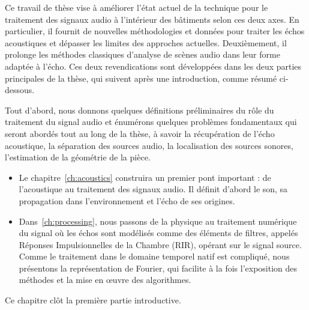 \mynewline
Ce travail de thèse vise à améliorer l'état actuel de la technique pour le traitement des signaux audio à l'intérieur des bâtiments selon ces deux axes.
En particulier, il fournit de nouvelles méthodologies et données pour traiter les échos acoustiques et dépasser les limites des approches actuelles.
Deuxièmement, il prolonge les méthodes classiques d'analyse de scènes audio dans leur forme adaptée à l'écho.
Ces deux revendications sont développées dans les deux parties principales de la thèse, qui suivent après une introduction, comme résumé ci-dessous.

Tout d'abord, nous donnons quelques définitions préliminaires du rôle du traitement du signal audio et énumérons quelques problèmes fondamentaux qui seront abordés tout au long de la thèse, à savoir la récupération de l'écho acoustique, la séparation des sources audio, la localisation des sources sonores, l'estimation de la géométrie de la pièce.
\begin{itemize}
    \item
    Le chapitre~\ref{ch:acoustics} construira un premier pont important : de l'acoustique au traitement des signaux audio.
    Il définit d'abord le son, sa propagation dans l'environnement et l'écho de ses origines.
    \item
    Dans~\ref{ch:processing}, nous passons de la physique au traitement numérique du signal où les échos sont modélisés comme des éléments de filtres, appelés Réponses Impulsionnelles de la Chambre (RIR), opérant sur le signal source.
    Comme le traitement dans le domaine temporel natif est compliqué, nous présentons la représentation de Fourier, qui facilite à la fois l'exposition des méthodes et la mise en œuvre des algorithmes.
\end{itemize}
Ce chapitre clôt la première partie introductive.


